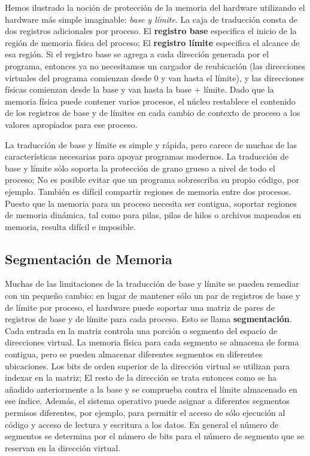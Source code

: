 \documentclass[10pt]{book}
\begin{document}
Hemos ilustrado la noción de protección de la memoria del hardware utilizando el hardware más simple imaginable: \textit{base y límite}. La caja de traducción consta de dos registros adicionales por proceso. El \textbf{registro base} especifica el inicio de la región de memoria física del proceso; El \textbf{registro límite} especifica el alcance de esa región. Si el registro base se agrega a cada dirección generada por el programa, entonces ya no necesitamos un cargador de reubicación (las direcciones virtuales del programa comienzan desde $0$ y van hasta el límite), y las direcciones físicas comienzan desde la base y van hasta la base $+$ límite. Dado que la memoria física puede contener varios procesos, el núcleo restablece el contenido de los registros de base y de límites en cada cambio de contexto de proceso a los valores apropiados para ese proceso.

La traducción de base y límite es simple y rápida, pero carece de muchas de las características necesarias para apoyar programas modernos. La traducción de base y límite sólo soporta la protección de grano grueso a nivel de todo el proceso; No es posible evitar que un programa sobrescriba su propio código, por ejemplo. También es difícil compartir regiones de memoria entre dos procesos. Puesto que la memoria para un proceso necesita ser contigua, soportar regiones de memoria dinámica, tal como para pilas, pilas de hilos o archivos mapeados en memoria, resulta difícil e imposible.

\subsection{Segmentación de Memoria}
Muchas de las limitaciones de la traducción de base y límite se pueden remediar con un pequeño cambio: en lugar de mantener sólo un par de registros de base y de límite por proceso, el hardware puede soportar una matriz de pares de registros de base y de límite para cada proceso. Esto se llama \textbf{segmentación}. Cada entrada en la matriz controla una porción o segmento del espacio de direcciones virtual. La memoria física para cada segmento se almacena de forma contigua, pero se pueden almacenar diferentes segmentos en diferentes ubicaciones. Los bits de orden superior de la dirección virtual se utilizan para indexar en la matriz; El resto de la dirección se trata entonces como se ha añadido anteriormente a la base y se comprueba contra el límite almacenado en ese índice. Además, el sistema operativo puede asignar a diferentes segmentos permisos diferentes, por ejemplo, para permitir el acceso de sólo ejecución al código y acceso de lectura y escritura a los datos. En general el número de segmentos se determina por el número de bits para el número de segmento que se reservan en la dirección virtual.
\end{document}
